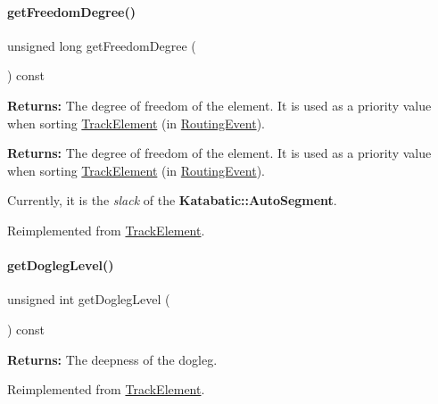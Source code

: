 \paragraph{\texorpdfstring{get\+Freedom\+Degree()}{getFreedomDegree()}}
{\footnotesize\ttfamily unsigned long get\+Freedom\+Degree (\begin{DoxyParamCaption}{ }\end{DoxyParamCaption}) const\hspace{0.3cm}{\ttfamily [virtual]}}

{\bfseries Returns\+:} The degree of freedom of the element. It is used as a priority value when sorting \hyperlink{classKite_1_1TrackElement}{Track\+Element} (in \hyperlink{classKite_1_1RoutingEvent}{Routing\+Event}).

{\bfseries Returns\+:} The degree of freedom of the element. It is used as a priority value when sorting \hyperlink{classKite_1_1TrackElement}{Track\+Element} (in \hyperlink{classKite_1_1RoutingEvent}{Routing\+Event}).

Currently, it is the {\itshape slack} of the \textbf{ Katabatic\+::\+Auto\+Segment}. 

Reimplemented from \hyperlink{classKite_1_1TrackElement_aa7552c20cc46abcac558627b2ca341f8}{Track\+Element}.

\mbox{\label{classKite_1_1TrackSegment_add78c6f914788c549f144998caacda84}} 
\paragraph{\texorpdfstring{get\+Dogleg\+Level()}{getDoglegLevel()}}
{\footnotesize\ttfamily unsigned int get\+Dogleg\+Level (\begin{DoxyParamCaption}{ }\end{DoxyParamCaption}) const\hspace{0.3cm}{\ttfamily [virtual]}}

{\bfseries Returns\+:} The deepness of the dogleg. 

Reimplemented from \hyperlink{classKite_1_1TrackElement_add78c6f914788c549f144998caacda84}{Track\+Element}.

\mbox{\label{classKite_1_1TrackSegment_a010b7fc8801c5b88aefa4137cf85186d}} 
